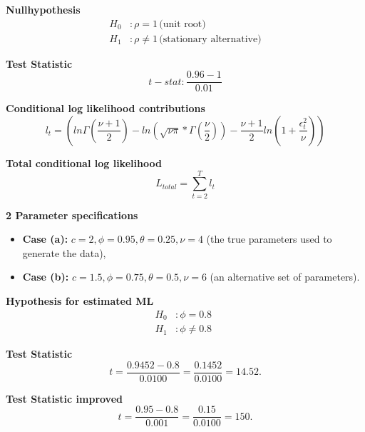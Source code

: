 \documentclass[11pt]{article}
\begin{document}
\textbf{Nullhypothesis}
\begin{equation}
\begin{aligned}
    H_0 &: \rho = 1 \, \text{(unit root)} \\
    H_1 &: \rho \neq 1 \, \text{(stationary alternative)}
\end{aligned}
\label{eq:dftest}
\end{equation}

\textbf{Test Statistic}
\begin{equation}
    t-stat: \frac{0.96-1}{0.01}
    \label{eq:dftstat2}
\end{equation}

\textbf{Conditional log likelihood contributions}
 \begin{equation}
      l_{t} =  (ln \Gamma(\frac{\nu +1}{2})- ln(\sqrt{\nu \pi} * \Gamma(\frac{\nu}{2})) - \frac{\nu+1}{2}ln(1+\frac{\epsilon_t^{2}}{\nu}))
      \label{eq:clc}
 \end{equation}

\textbf{Total conditional log likelihood}
\begin{equation}
    L_{total} = \sum_{t=2}^{T} l_t
    \label{eq:tcl}
\end{equation}

\textbf{2 Parameter specifications}
\begin{itemize}
    \item \textbf{Case (a):} $c = 2, \phi = 0.95, \theta = 0.25, \nu = 4$ (the true parameters used to generate the data),
    \item \textbf{Case (b):} $c = 1.5, \phi = 0.75, \theta = 0.5, \nu = 6$ (an alternative set of parameters).
    \label{specifica}
\end{itemize}

\textbf{Hypothesis for estimated ML}
\begin{equation}
\begin{aligned}
    H_0 &: \phi = 0.8 \, \ \\
    H_1 &: \phi \neq 0.8 \,
\end{aligned}
\label{eq:nullacht}
\end{equation}

\textbf{Test Statistic}
\begin{equation}
t = \frac{0.9452 - 0.8}{0.0100} = \frac{0.1452}{0.0100} = 14.52.
    \label{eq:tstatmlone}
\end{equation}

\textbf{Test Statistic improved}
\begin{equation}
t = \frac{0.95 - 0.8}{0.001} = \frac{0.15}{0.0100} = 150.
    \label{eq:tstatmltwo}
\end{equation}
\end{document}
